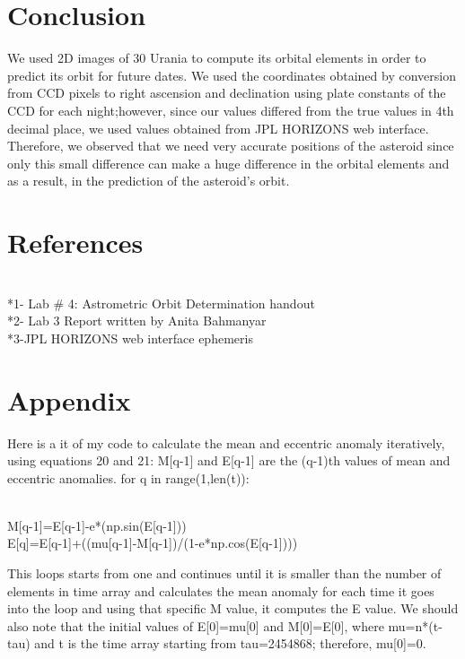 \documentclass[letterpaper,12pt]{article}
\begin{document}
\section{Conclusion}
\label{sec:conclusion}
We used 2D images of 30 Urania to compute its orbital elements in order to predict its orbit for future dates. We used the coordinates obtained by conversion from CCD pixels to right ascension and declination using plate constants of the CCD for each night;however, since our values differed from the true values in 4th decimal place, we used values obtained from JPL HORIZONS web interface. Therefore, we observed that we need very accurate positions of the asteroid since only this small difference can make a huge difference in the orbital elements and as a result, in the prediction of the asteroid's orbit.

\section{References}
\label{sec:references}
\\*1- Lab # 4: Astrometric Orbit Determination handout
\\*2- Lab 3 Report written by Anita Bahmanyar
\\*3-JPL HORIZONS web interface ephemeris

\section{Appendix}
\label{sec:appendix}
Here is a it of my code to calculate the mean and eccentric anomaly iteratively, using equations 20 and  21:
M[q-1] and E[q-1] are the (q-1)th values of mean and eccentric anomalies. 
for q in range(1,len(t)):

\\       M[q-1]=E[q-1]-e*(np.sin(E[q-1]))
\\       E[q]=E[q-1]+((mu[q-1]-M[q-1])/(1-e*np.cos(E[q-1]))) 
   
This loops starts from one and continues until it is smaller than the number of elements in time array and calculates the mean anomaly for each time it goes into the loop and using that specific M value, it computes the E value. We should also note that the initial values of E[0]=mu[0] and M[0]=E[0], where mu=n*(t-tau) and t is the time array starting from tau=2454868; therefore, mu[0]=0.
    
\end{document}
